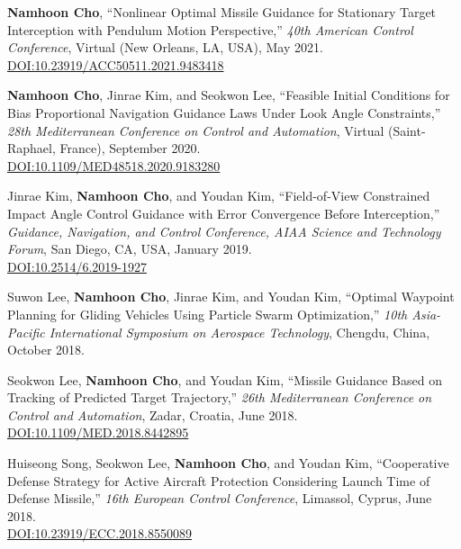 \begin{enumerate}[itemsep=0.5em, label={[}C\arabic*{]}]
\item \textbf{Namhoon Cho}, ``Nonlinear Optimal Missile Guidance for Stationary Target Interception with Pendulum Motion Perspective,'' \textit{40th American Control Conference}, Virtual (New Orleans, LA, USA), May 2021. \\
\href{https://doi.org/10.23919/ACC50511.2021.9483418}{DOI:10.23919/ACC50511.2021.9483418}

\item \textbf{Namhoon Cho}, Jinrae Kim, and Seokwon Lee, ``Feasible Initial Conditions for Bias Proportional Navigation Guidance Laws Under Look Angle Constraints,'' \textit{28th Mediterranean Conference on Control and Automation}, Virtual (Saint-Raphael, France), September 2020. \\
\href{https://doi.org/10.1109/MED48518.2020.9183280}{DOI:10.1109/MED48518.2020.9183280}

\item Jinrae Kim, \textbf{Namhoon Cho}, and Youdan Kim, ``Field-of-View Constrained Impact Angle Control Guidance with Error Convergence Before Interception,'' \textit{Guidance, Navigation, and Control Conference, AIAA Science and Technology Forum}, San Diego, CA, USA, January 2019. \\
\href{https://doi.org/10.2514/6.2019-1927}{DOI:10.2514/6.2019-1927}

\item Suwon Lee, \textbf{Namhoon Cho}, Jinrae Kim, and Youdan Kim, ``Optimal Waypoint Planning for Gliding Vehicles Using Particle Swarm Optimization,'' \textit{10th Asia-Pacific International Symposium on Aerospace Technology}, Chengdu, China, October 2018. 

\item Seokwon Lee, \textbf{Namhoon Cho}, and Youdan Kim, ``Missile Guidance Based on Tracking of Predicted Target Trajectory,'' \textit{26th Mediterranean Conference on Control and Automation}, Zadar, Croatia, June 2018. \\
\href{https://doi.org/10.1109/MED.2018.8442895}{DOI:10.1109/MED.2018.8442895}

\item Huiseong Song, Seokwon Lee, \textbf{Namhoon Cho}, and Youdan Kim, ``Cooperative Defense Strategy for Active Aircraft Protection Considering Launch Time of Defense Missile,'' \textit{16th European Control Conference}, Limassol, Cyprus, June 2018. \\
\href{https://doi.org/10.23919/ECC.2018.8550089}{DOI:10.23919/ECC.2018.8550089}


\end{enumerate}
